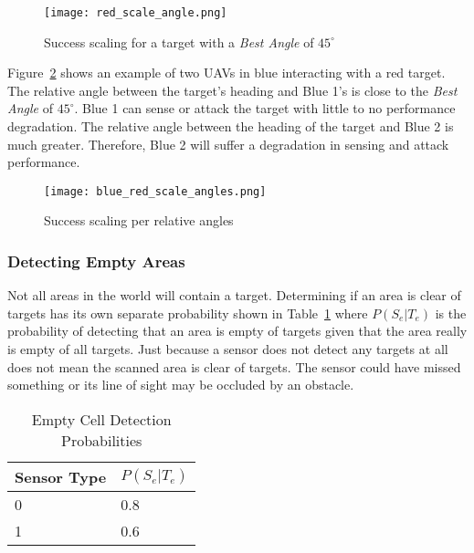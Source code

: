 \begin{figure}[H]
	\centering
	\texttt{[image: red\_scale\_angle.png]}
	\caption{Success scaling for a target with a \textit{Best Angle} of $45^{\circ}$}
	\label{fig:targetAngles}
\end{figure}

Figure~\ref{fig:blue_red_angles} shows an example of two UAVs in blue interacting with a red target.  The relative angle between the target's heading and Blue 1's is close to the \textit{Best Angle} of $45^{\circ}$.  Blue 1 can sense or attack the target with little to no performance degradation.  The relative angle between the heading of the target and Blue 2 is much greater.  Therefore, Blue 2 will suffer a degradation in sensing and attack performance.

\begin{figure}[H]
	\centering
	\texttt{[image: blue\_red\_scale\_angles.png]}
	\caption{Success scaling per relative angles}
	\label{fig:blue_red_angles}
\end{figure}


\subsubsection{Detecting Empty Areas}
Not all areas in the world will contain a target.  Determining if an area is clear of targets has its own separate probability shown in Table~\ref{tab:snsrEmptyProb} where $P(S_{e}|T_{e})$ is the probability of detecting that an area is empty of targets given that the area really is empty of all targets.  Just because a sensor does not detect any targets at all does not mean the scanned area is clear of targets.  The sensor could have missed something or its line of sight may be occluded by an obstacle.

\begin{table}[H]
	\caption{Empty Cell Detection Probabilities}
	\centering
	\label{tab:snsrEmptyProb}
	\begin{tabular}{|l|l|}
		\hline
		Sensor Type & $P(S_{e}|T_{e})$\\ \hline
		0 & 0.8\\ \hline
		1 & 0.6\\ \hline
	\end{tabular}
\end{table}

